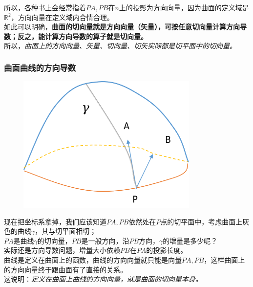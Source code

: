 \documentclass[hpyerref,UTF8,a4paper,titlepage,12pt,oneside]{ctexbook}
\theoremstyle{definition}
\begin{document}
所以，各种书上会经常指着$PA,PB$在$n$上的投影为方向向量，因为曲面的定义域是$\mathbb{R}^2$，方向向量在定义域内合情合理。\\

如此可以明确，\textbf{曲面的切向量就是方向向量（矢量），可按任意切向量计算方向导数；反之，能计算方向导数的算子就是切向量。}\\

所以，\textit{曲面上的方向向量、矢量、切向量、切矢实际都是切平面中的切向量。}

\subsubsection*{曲面曲线的方向导数}

\begin{figure}[H]
	\begin{center}
		\includegraphics[width=0.8\textwidth]{images/vector2.png}
	\end{center}
\end{figure}	

现在把坐标系拿掉，我们应该知道$PA,PB$依然处在$P$点的切平面中，考虑曲面上灰色的曲线$\gamma$，其与切平面相切；\\

$PA$是曲线$\gamma$的切向量，$PB$是一般方向，沿$PB$方向，$\gamma$的增量是多少呢？\\

实际还是方向导数问题，增量大小依赖$PB$在$PA$的投影长度。\\

曲线是定义在曲面上的函数，曲线的方向向量就只能是向量$PA,PB$，这样曲面上的方向向量终于跟曲面有了直接的关系。\\

这说明：\textit{定义在曲面上曲线的方向向量，就是曲面的切向量本身。}\\
\end{document}

